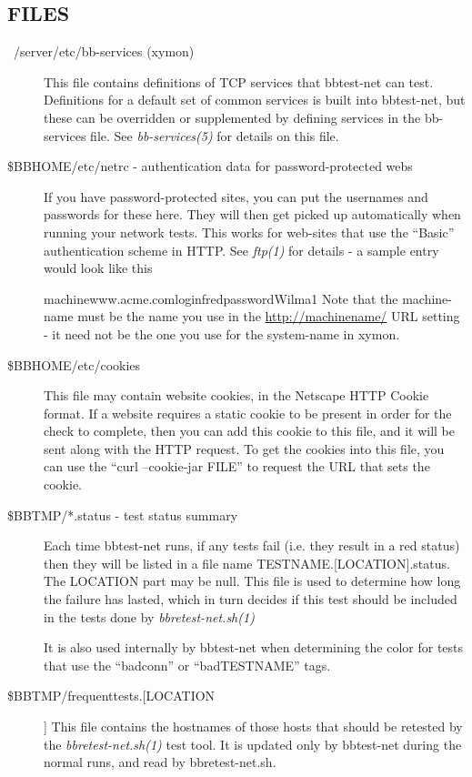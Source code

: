 \subsection{FILES}
\begin{description}
\item[~/server/etc/bb-services (xymon)] This file contains
  definitions of TCP services that bbtest-net can test. Definitions
  for a default set of common services is built into bbtest-net, but
  these can be overridden or supplemented by defining services in the
  bb-services file. See \emph{bb-services(5)} for details on this
  file. 


 

\item[\$BBHOME/etc/netrc - authentication data for password-protected
  webs] If you have password-protected sites, you can put the
  usernames and passwords for these here. They will then get picked up
  automatically when running your network tests. This works for
  web-sites that use the ``Basic'' authentication scheme in HTTP. See
  \emph{ftp(1)} for details - a sample entry would look like this  

 
machinewww.acme.comloginfredpasswordWilma1  
 Note that the machine-name must be the name you use in the
 \url{http://machinename/} URL setting - it need not be the one you
 use for the system-name in xymon. 


 
\item[\$BBHOME/etc/cookies] This file may contain website cookies, in
  the Netscape HTTP Cookie format. If a website requires a static
  cookie to be present in order for the check to complete, then you
  can add this cookie to this file, and it will be sent along with the
  HTTP request. To get the cookies into this file, you can use the
  ``curl --cookie-jar FILE'' to request the URL that sets the cookie. 


 

\item[\$BBTMP/*.status - test status summary] Each time bbtest-net
  runs, if any tests fail (i.e. they result in a red status) then they
  will be listed in a file name TESTNAME.[LOCATION].status. The
  LOCATION part may be null. This file is used to determine how long
  the failure has lasted, which in turn decides if this test should be
  included in the tests done by \emph{bbretest-net.sh(1)}

 
 It is also used internally by bbtest-net when determining the color
 for tests that use the ``badconn'' or ``badTESTNAME'' tags. 


 

\item[\$BBTMP/frequenttests.[LOCATION]] This file contains the
  hostnames of those hosts that should be retested by the
  \emph{bbretest-net.sh(1)} test tool. It is updated only by
  bbtest-net during the normal runs, and read by bbretest-net.sh. 



\end{description}
